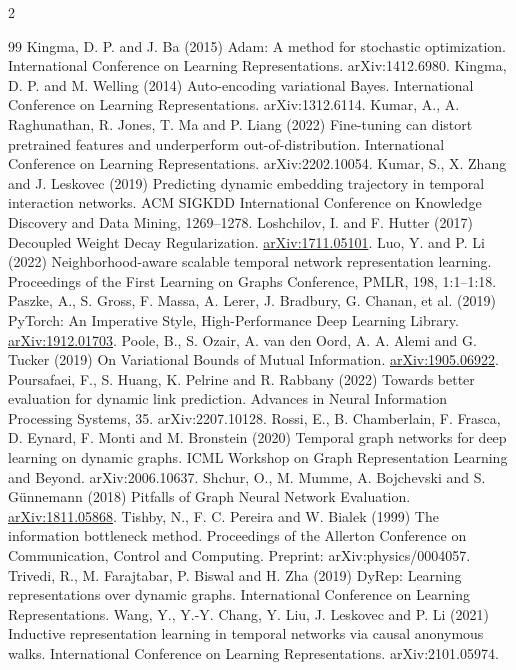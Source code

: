 \documentclass[a4paper,10pt,fleqn]{article}
\begin{document}
\begin{multicols}{2}
\begin{thebibliography}{99}
 Kingma, D. P. and J. Ba (2015) Adam: A method for stochastic optimization. International Conference on Learning Representations. arXiv:1412.6980.
 Kingma, D. P. and M. Welling (2014) Auto-encoding variational Bayes. International Conference on Learning Representations. arXiv:1312.6114.
 Kumar, A., A. Raghunathan, R. Jones, T. Ma and P. Liang (2022) Fine-tuning can distort pretrained features and underperform out-of-distribution. International Conference on Learning Representations. arXiv:2202.10054.
 Kumar, S., X. Zhang and J. Leskovec (2019) Predicting dynamic embedding trajectory in temporal interaction networks. ACM SIGKDD International Conference on Knowledge Discovery and Data Mining, 1269--1278.
 Loshchilov, I. and F. Hutter (2017) Decoupled Weight Decay Regularization. \href{https://arxiv.org/abs/1711.05101}{arXiv:1711.05101}.
 Luo, Y. and P. Li (2022) Neighborhood-aware scalable temporal network representation learning. Proceedings of the First Learning on Graphs Conference, PMLR, 198, 1:1--1:18.
 Paszke, A., S. Gross, F. Massa, A. Lerer, J. Bradbury, G. Chanan, et al. (2019) PyTorch: An Imperative Style, High-Performance Deep Learning Library. \href{https://arxiv.org/abs/1912.01703}{arXiv:1912.01703}.
 Poole, B., S. Ozair, A. van den Oord, A. A. Alemi and G. Tucker (2019) On Variational Bounds of Mutual Information. \href{https://arxiv.org/abs/1905.06922}{arXiv:1905.06922}.
 Poursafaei, F., S. Huang, K. Pelrine and R. Rabbany (2022) Towards better evaluation for dynamic link prediction. Advances in Neural Information Processing Systems, 35. arXiv:2207.10128.
 Rossi, E., B. Chamberlain, F. Frasca, D. Eynard, F. Monti and M. Bronstein (2020) Temporal graph networks for deep learning on dynamic graphs. ICML Workshop on Graph Representation Learning and Beyond. arXiv:2006.10637.
 Shchur, O., M. Mumme, A. Bojchevski and S. Günnemann (2018) Pitfalls of Graph Neural Network Evaluation. \href{https://arxiv.org/abs/1811.05868}{arXiv:1811.05868}.
 Tishby, N., F. C. Pereira and W. Bialek (1999) The information bottleneck method. Proceedings of the Allerton Conference on Communication, Control and Computing. Preprint: arXiv:physics/0004057.
 Trivedi, R., M. Farajtabar, P. Biswal and H. Zha (2019) DyRep: Learning representations over dynamic graphs. International Conference on Learning Representations.
 Wang, Y., Y.-Y. Chang, Y. Liu, J. Leskovec and P. Li (2021) Inductive representation learning in temporal networks via causal anonymous walks. International Conference on Learning Representations. arXiv:2101.05974.

\end{thebibliography}
\end{multicols}
\end{document}

